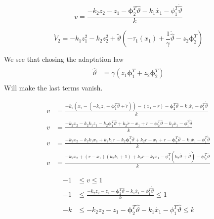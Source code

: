 \documentclass[12pt,a4]{article}
\begin{document}
\begin{equation}
	v = \frac{-k_2 z_2 - z_1 - \bm{\phi}_2^T \hat{\vartheta} -  k_1 \dot{x_1} -\phi_1^T \dot{\hat{\vartheta}}}{k}
\end{equation}

\begin{equation}
	\dot{V}_2  = - k_1 z_1^2 - k_2 z_2^2 + \tilde{\vartheta} \left( -\tau_1(x_1) + \frac{1}{\gamma}\dot{\hat{\vartheta}} - z_2\bm{\phi}_2^T	\right)
\end{equation}

We see that chosing the adaptation law
\begin{align}
	\dot{\hat{\vartheta}} & = \gamma   ( z_1\bm{\phi}_1^T + z_2\bm{\phi}_2^T ) \\
\end{align}
Will make the last terms vanish.


\begin{align}
	v & = \frac{-k_2 (x_2-(- k_1 z_1 -  \bm{\phi}_1^T \hat{\vartheta} + \dot{r}))- (x_1-r)- \bm{\phi}_2^T \hat{\vartheta} -  k_1 \dot{x_1} -\phi_1^T \dot{\hat{\vartheta}}}{k}                  \\
	v & = \frac{-k_2 x_2 - k_2 k_1 z_1 -  k_2\bm{\phi}_1^T \hat{\vartheta} + k_2\dot{r} -x_1 +r -\bm{\phi}_2^T \hat{\vartheta} -  k_1\dot{x_1} -\phi_1^T \dot{\hat{\vartheta}}}{k}              \\
	v & = \frac{-k_2 x_2 - k_2 k_1 x_1 + k_2 k_1 r -  k_2\bm{\phi}_1^T \hat{\vartheta} + k_2\dot{r} -x_1 + r -\bm{\phi}_2^T \hat{\vartheta} -  k_1\dot{x_1} -\phi_1^T \dot{\hat{\vartheta}}}{k} \\
	v & = \frac{-k_2 x_2 + (r - x_1)(k_2 k_1 + 1) + k_2\dot{r}  -  k_1\dot{x_1} - \phi_1^T( k_2\hat{\vartheta} + \dot{\hat{\vartheta}} ) -\bm{\phi}_2^T \hat{\vartheta}  }{k}
\end{align}

\begin{align}
	-1 & \leq v \leq 1                                                                                                         \\
	-1 & \leq \frac{-k_2 z_2 - z_1 - \bm{\phi}_2^T \hat{\vartheta} -  k_1 \dot{x_1} -\phi_1^T \dot{\hat{\vartheta}}}{k} \leq 1 \\
	-k & \leq -k_2 z_2 - z_1 - \bm{\phi}_2^T \hat{\vartheta} -  k_1 \dot{x_1} -\phi_1^T \dot{\hat{\vartheta}}\leq k
\end{align}
\end{document}
